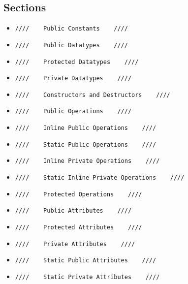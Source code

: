 \documentclass[a4paper,twoside,15pt]{book}
\begin{document}
        \subsection{Sections}
            \begin{itemize}
                \item {\color{highlight_c_comment}\verb'////    Public Constants    ////'}
                \item {\color{highlight_c_comment}\verb'////    Public Datatypes    ////'}
                \item {\color{highlight_c_comment}\verb'////    Protected Datatypes    ////'}
                \item {\color{highlight_c_comment}\verb'////    Private Datatypes    ////'}
                \item {\color{highlight_c_comment}\verb'////    Constructors and Destructors    ////'}
                \item {\color{highlight_c_comment}\verb'////    Public Operations    ////'}
                \item {\color{highlight_c_comment}\verb'////    Inline Public Operations    ////'}
                \item {\color{highlight_c_comment}\verb'////    Static Public Operations    ////'}
                \item {\color{highlight_c_comment}\verb'////    Inline Private Operations    ////'}
                \item {\color{highlight_c_comment}\verb'////    Static Inline Private Operations    ////'}
                \item {\color{highlight_c_comment}\verb'////    Protected Operations    ////'}
                \item {\color{highlight_c_comment}\verb'////    Public Attributes    ////'}
                \item {\color{highlight_c_comment}\verb'////    Protected Attributes    ////'}
                \item {\color{highlight_c_comment}\verb'////    Private Attributes    ////'}
                \item {\color{highlight_c_comment}\verb'////    Static Public Attributes    ////'}
                \item {\color{highlight_c_comment}\verb'////    Static Private Attributes    ////'}
            \end{itemize}
\end{document}
